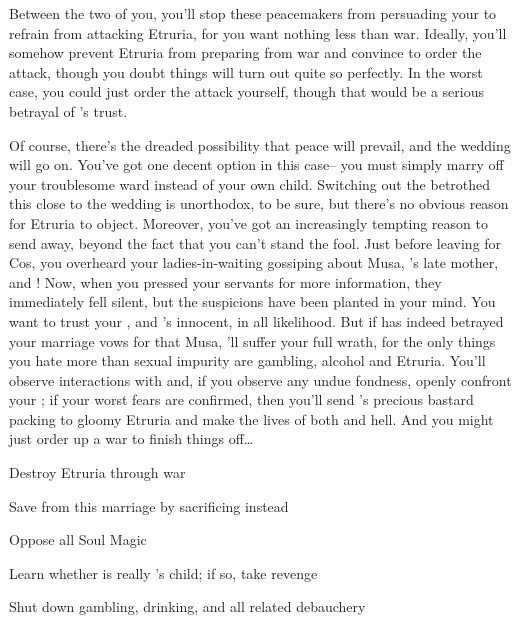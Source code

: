 \documentclass[char]{Kos}
\begin{document}
Between the two of you, you'll stop these peacemakers from persuading your \cScythiaKing{\spouse} to refrain from attacking Etruria, for you want nothing less than war. Ideally, you'll somehow prevent Etruria from preparing from war and convince \cScythiaKing{} to order the attack, though you doubt things will turn out quite so perfectly. In the worst case, you could just order the attack yourself, though that would be a serious betrayal of \cScythiaKing{}'s trust.

Of course, there's the dreaded possibility that peace will prevail, and the wedding will go on. You've got one decent option in this case-- you must simply marry off your troublesome ward instead of your own child. Switching out the betrothed this close to the wedding is unorthodox, to be sure, but there's no obvious reason for Etruria to object. Moreover, you've got an increasingly tempting reason to send \cWard{\them} away,  beyond the fact that you can't stand the fool. Just before leaving for Cos, you overheard your ladies-in-waiting gossiping about Musa, \cWard{}'s late mother, and \cScythiaKing{}! Now, when you pressed your servants for more information, they immediately fell silent, but the suspicions have been planted in your mind. You want to trust your \cScythiaKing{\spouse}, and \cScythiaKing{\they}'s innocent, in all likelihood. But if \cScythiaKing{} has indeed betrayed your marriage vows for that Musa, \cScythiaKing{\they}'ll suffer your full wrath, for the only things you hate more than sexual impurity are gambling, alcohol and Etruria. You'll observe \cScythiaKing{\their} interactions with \cWard{} and, if you observe any undue fondness, openly confront your \cScythiaKing{\spouse}; if your worst fears are confirmed, then you'll send \cScythiaKing{}'s precious bastard packing to gloomy Etruria and make the lives of both \cScythiaKing{\parent} and \cWard{\offspring} hell. And you might just order up a war to finish things off\ldots


\begin{itemz}[Goals]
\item Destroy Etruria through war
\item Save \cBride{} from this marriage by sacrificing \cWard{} instead
\item Oppose all Soul Magic
\item Learn whether \cWard{} is really \cScythiaKing{}'s child; if so, take revenge
\item Shut down gambling, drinking, and all related debauchery
\end{itemz}
\end{document}
